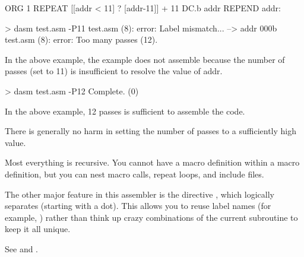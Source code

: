  \begin{code}
   ORG 1
   REPEAT [[addr < 11] ? [addr-11]] + 11
     DC.b addr
   REPEND
 addr:
 \end{code}
 
 \begin{outputx}
 > dasm test.asm -P11
test.asm (8): error: Label mismatch...
 --> addr 000b                  
test.asm (8): error: Too many passes (12).
\end{outputx}
  
In the above example, the example does not assemble because the number of passes (set to 11) is insufficient to resolve the value of addr.  
    
 \begin{outputx}
 > dasm test.asm -P12
 Complete. (0)
\end{outputx} 
 
 In the above example, 12 passes is sufficient to assemble the code.
 
 There is generally no harm in setting the number of passes to a sufficiently high value.
 
 
 Most everything is recursive.  You cannot have a macro definition
 within a macro definition, but you can nest macro calls, repeat loops,
 and include files.
 
 The other major feature in this assembler is the  directive , which logically separates  (starting with a dot).  This
 allows you to reuse label names (for example, ) rather than
 think up crazy combinations of the current subroutine to keep it all
 unique.
 
 See  and .
 
 